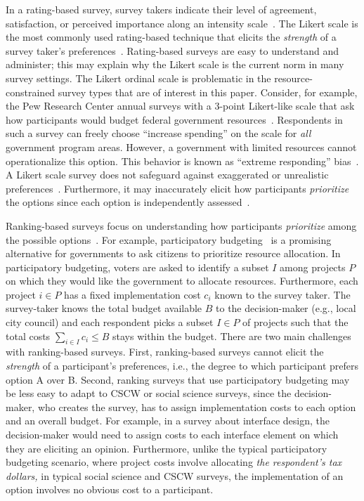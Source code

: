 {{In a rating-based survey, survey takers indicate their level of agreement, satisfaction, or perceived importance along an intensity scale~\cite{moors2016two}. The Likert scale is the most commonly used rating-based technique that elicits the \textit{strength} of a survey taker's preferences~\cite{likert1932technique}. Rating-based surveys are easy to understand and administer; this may explain why the Likert scale is the current norm in many survey settings. The Likert ordinal scale is problematic in the resource-constrained survey types that are of interest in this paper. Consider, for example, the Pew Research Center annual surveys with a 3-point Likert-like scale that ask how participants would budget federal government resources~\cite{pew_spending}. Respondents in such a survey can freely choose  ``increase spending'' on the scale for \textit{all} government program areas. However, a government with limited resources cannot operationalize this option. This behavior is known as ``extreme responding'' bias~\cite{batchelor2016extreme, furnham1986response, meisenberg2008acquiescent}. A Likert scale survey does not safeguard against exaggerated or unrealistic preferences~\cite{araujo2017much, vavreck2007exaggerated}. Furthermore, it may inaccurately elicit how participants \textit{prioritize} the options since each option is independently assessed~\cite{alwin1985measurement}. 

Ranking-based surveys focus on understanding how participants \textit{prioritize} among the possible options~\cite{moors2016two}. For example, participatory budgeting~\cite{cabannes2004participatory,goel2015knapsack,Goel2016, Lee2014, benade2020preference} is a promising alternative for governments to ask citizens to prioritize resource allocation.  In participatory budgeting, voters are asked to identify a subset $I$ among projects $P$ on which they would like the government to allocate resources. Furthermore, each project $i \in P$ has a fixed implementation cost $c_i$ known to the survey taker. The survey-taker knows the total budget available $B$ to the decision-maker (e.g., local city council) and each respondent picks a subset $I \in P$ of projects such that the total costs $\sum_{i \in I} c_i \leqslant B$ stays within the budget. There are two main challenges with ranking-based surveys. First, ranking-based surveys cannot elicit the \textit{strength} of a participant's preferences, i.e., the degree to which participant prefers option A over B. Second, ranking surveys that use participatory budgeting may be less easy to adapt to CSCW or social science surveys, since the decision-maker, who creates the survey, has to assign implementation costs to each option and an overall budget. For example, in a survey about interface design, the decision-maker would need to assign costs to each interface element on which they are eliciting an opinion. Furthermore, unlike the typical participatory budgeting scenario, where project costs involve allocating \textit{the respondent's tax dollars,} in typical social science and CSCW surveys, the implementation of an option involves no obvious cost to a participant. 

}}
